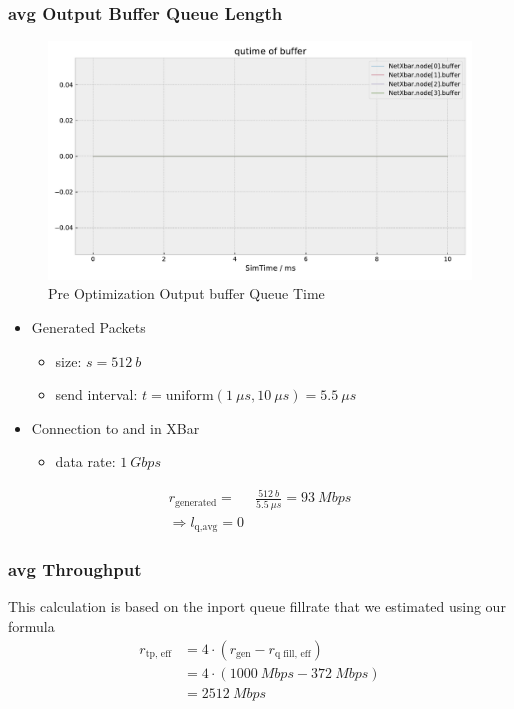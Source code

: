 \documentclass[]{scrartcl}
\begin{document}
    \subsubsection{avg Output Buffer Queue Length}
        \begin{figure}[H]
            \centering
            \includegraphics[width=\columnwidth, page=6]{../../python/results/preopt-General-0}
            \caption{Pre Optimization Output buffer Queue Time}%
            \label{fig:preopt-output-qtime}
        \end{figure}
        \begin{itemize}
            \item Generated Packets
                \begin{itemize}
                    \item size: $ s = \SI{512}{b}$
                    \item send interval: $ t = \text{uniform}(\SI{1}{\mu s}, \SI{10}{\mu s}) = \SI{5.5}{\mu s}$
                \end{itemize}
            \item Connection to and in XBar
                \begin{itemize}
                    \item data rate: $\SI{1}{Gbps}$
                \end{itemize}
        \end{itemize}
        \begin{align}
            r_\text{generated} =& \frac{\SI{512}{b}}{\SI{5.5}{\mu s}} = \SI{93}{Mbps}\\
            \Rightarrow l_\text{q,avg} = 0
        \end{align}

    \subsubsection{avg Throughput}
        This calculation is based on the inport queue fillrate that we estimated using our formula
        \begin{align}
            r_\text{tp, eff} &= 4\cdot\left( r_\text{gen} - r_\text{q fill, eff} \right)\\
                      &= 4 \cdot \left( \SI{1000}{Mbps} - \SI{372}{Mbps}\right)\\
                      &= \SI{2512}{Mbps}
        \end{align}
\end{document}
